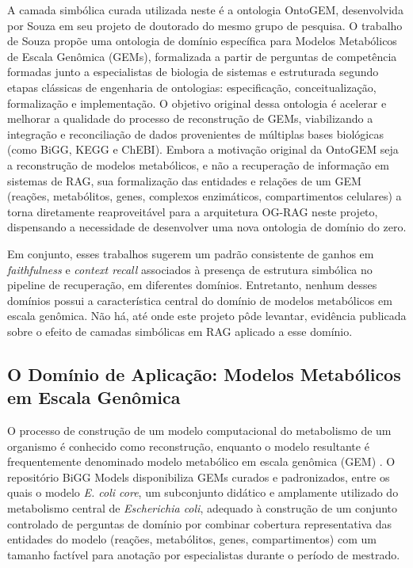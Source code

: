 \documentclass{article}
\begin{document}
A camada simbólica curada utilizada neste é a ontologia OntoGEM, desenvolvida por Souza \cite{souza2025ontogem} em seu projeto de doutorado do mesmo grupo de pesquisa. O trabalho de Souza propõe uma ontologia de domínio específica para Modelos Metabólicos de Escala Genômica (GEMs), formalizada a partir de perguntas de competência formadas junto a especialistas de biologia de sistemas e estruturada segundo etapas clássicas de engenharia de ontologias: especificação, conceitualização, formalização e implementação. O objetivo original dessa ontologia é acelerar e melhorar a qualidade do processo de reconstrução de GEMs, viabilizando a integração e reconciliação de dados provenientes de múltiplas bases biológicas (como BiGG, KEGG e ChEBI). Embora a motivação original da OntoGEM seja a reconstrução de modelos metabólicos, e não a recuperação de informação em sistemas de RAG, sua formalização das entidades e relações de um GEM (reações, metabólitos, genes, complexos enzimáticos, compartimentos celulares) a torna diretamente reaproveitável para a arquitetura OG-RAG neste projeto, dispensando a necessidade de desenvolver uma nova ontologia de domínio do zero.

Em conjunto, esses trabalhos sugerem um padrão consistente de ganhos em \textit{faithfulness} e \textit{context recall} associados à presença de estrutura simbólica no pipeline de recuperação, em diferentes domínios. Entretanto, nenhum desses domínios possui a característica central do domínio de modelos metabólicos em escala genômica. Não há, até onde este projeto pôde levantar, evidência publicada sobre o efeito de camadas simbólicas em RAG aplicado a esse domínio.


\subsection{O Domínio de Aplicação: Modelos Metabólicos em Escala Genômica}


O processo de construção de um modelo computacional do metabolismo de um organismo é conhecido como reconstrução, enquanto o modelo resultante é frequentemente denominado modelo metabólico em escala genômica (GEM) \cite{souza2025ontogem}. O repositório BiGG Models \cite{king2016bigg} disponibiliza GEMs curados e padronizados, entre os quais o modelo \textit{E. coli core}, um subconjunto didático e amplamente utilizado do metabolismo central de \textit{Escherichia coli}, adequado à construção de um conjunto controlado de perguntas de domínio por combinar cobertura representativa das entidades do modelo (reações, metabólitos, genes, compartimentos) com um tamanho factível para anotação por especialistas durante o período de mestrado.
\end{document}
